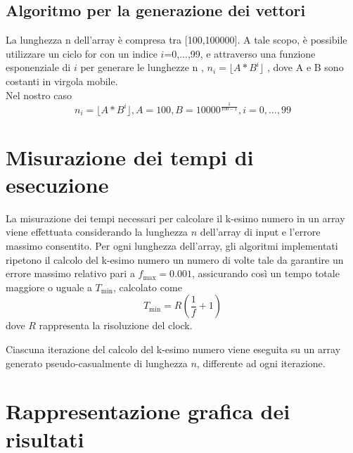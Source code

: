 \documentclass[a4paper]{article}
\begin{document}
\subsection{Algoritmo per la generazione dei vettori}
La lunghezza n dell'array è compresa tra [100,100000].
A tale scopo, è possibile utilizzare un ciclo for con un indice $i$=0,...,99, e attraverso una funzione esponenziale di $i$ per generare le lunghezze n
, $n_i=\lfloor A*B^i\rfloor$ , dove A e B sono costanti in virgola mobile.\\
Nel nostro caso \[n_i=\lfloor A*B^i\rfloor, A=100, B=10000^{\frac{1}{100-1}},i=0,...,99\]
\section{Misurazione dei tempi di esecuzione}
La misurazione dei tempi necessari per calcolare il k-esimo numero in un array viene effettuata considerando la lunghezza \( n \) dell'array di input e l'errore massimo consentito. Per ogni lunghezza dell'array, gli algoritmi implementati ripetono il calcolo del k-esimo numero un numero di volte tale da garantire un errore massimo relativo pari a \( f_{\max} = 0.001 \), assicurando così un tempo totale maggiore o uguale a \( T_{\min} \), calcolato come \[ T_{\min} = R \left( \frac{1}{f} + 1 \right) \] dove \( R \) rappresenta la risoluzione del clock.

Ciascuna iterazione del calcolo del k-esimo numero viene eseguita su un array generato pseudo-casualmente di lunghezza \( n \), differente ad ogni iterazione.
\newpage
\section{Rappresentazione grafica dei risultati}
\end{document}
